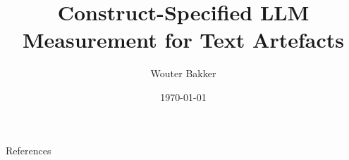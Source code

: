 \documentclass[aspectratio=169]{beamer}
\title{Construct-Specified LLM Measurement for Text Artefacts}
\author{Wouter Bakker}
\date{\today}
\begin{document}










\begin{frame}[allowframebreaks]{References}
    
    
\end{frame}



\end{document}
